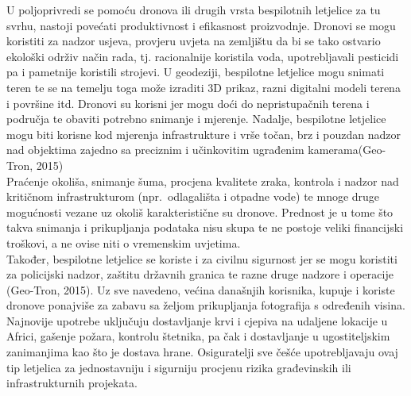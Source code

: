 \documentclass[times, utf8, diplomski]{fer}
\begin{document}
U poljoprivredi se pomoću dronova ili drugih vrsta bespilotnih letjelice za tu svrhu, nastoji povećati produktivnost i efikasnost  proizvodnje.  Dronovi  se  mogu  koristiti  za  nadzor usjeva,  provjeru  uvjeta  na  zemljištu  da  bi  se  tako  ostvario  ekološki  održiv  način  rada,  tj. racionalnije koristila voda, upotrebljavali pesticidi pa i pametnije koristili strojevi. U geodeziji, bespilotne letjelice mogu snimati teren te se na temelju toga može izraditi 3D prikaz, razni digitalni modeli terena i površine itd. Dronovi su korisni jer mogu doći do nepristupačnih terena i područja te obaviti potrebno snimanje  i mjerenje.  Nadalje,  bespilotne letjelice  mogu  biti korisne kod mjerenja infrastrukture i vrše točan, brz i pouzdan nadzor nad objektima zajedno sa preciznim i učinkovitim ugrađenim kamerama(Geo-Tron, 2015)\\
Praćenje  okoliša,  snimanje  šuma,  procjena  kvalitete  zraka,  kontrola   i nadzor nad kritičnom infrastrukturom (npr.~odlagališta  i otpadne  vode)  te  mnoge  druge  mogućnosti  vezane  uz  okoliš  karakteristične  su  dronove. Prednost je u tome što takva snimanja i prikupljanja podataka nisu skupa te ne postoje veliki financijski troškovi, a ne ovise niti o vremenskim uvjetima.\\
Također, bespilotne letjelice se koriste i za civilnu sigurnost jer se mogu koristiti za policijski nadzor, zaštitu državnih granica te razne druge nadzore i operacije (Geo-Tron, 2015). Uz sve navedeno, većina današnjih korisnika, kupuje i koriste dronove ponajviše za zabavu sa željom prikupljanja fotografija s određenih visina. 
Najnovije upotrebe uključuju dostavljanje krvi i cjepiva na udaljene lokacije u Africi, gašenje požara, kontrolu štetnika, pa čak i dostavljanje u ugostiteljskim zanimanjima kao što je dostava hrane.
Osiguratelji  sve  češće  upotrebljavaju ovaj  tip  letjelica za  jednostavniju  i  sigurniju procjenu rizika građevinskih ili infrastrukturnih projekata.
\end{document}
